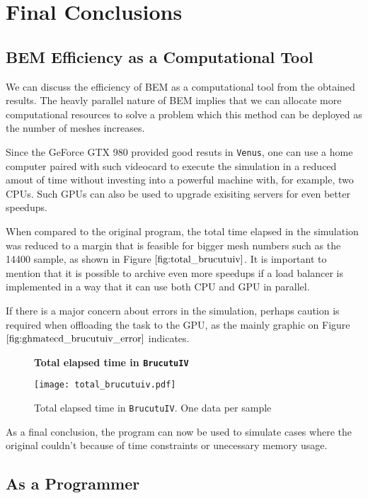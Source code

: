 \chapter{Final Conclusions}
\label{cap:conclusoes}

\section{BEM Efficiency as a Computational Tool}

We can discuss the efficiency of BEM as a computational tool from the obtained results. 
The heavly parallel nature of BEM implies that we can allocate more computational resources 
to solve a problem which this method can be deployed as the number of meshes increases.

Since the GeForce GTX 980 provided good resuts in \texttt{Venus}, one can use a home 
computer paired with such videocard to execute the simulation in a reduced amout of time 
without investing into a powerful machine with, for example, two CPUs. Such GPUs can also 
be used to upgrade exisiting servers for even better speedups.

When compared to the original program, the total time elapsed in the simulation was reduced 
to a margin that is feasible for bigger mesh numbers such as the 14400 sample, as shown in 
Figure $\ref{fig:total_brucutuiv}$. It is important to mention that it is possible to archive even more speedups if a 
load balancer is implemented in a way that it can use both CPU and GPU in parallel.

If there is a major concern about errors in the simulation, perhaps caution is required when 
offloading the task to the GPU, as the mainly graphic on Figure $\ref{fig:ghmatecd_brucutuiv_error}$ 
indicates.

\begin{figure}[ht]
\centering
\textbf{Total elapsed time in \texttt{BrucutuIV}}\par\medskip
\texttt{[image: total\_brucutuiv.pdf]}
\caption{Total elapsed time in \texttt{BrucutuIV}. One data per sample}
\label{fig:total_brucutuiv}
\end{figure}

As a final conclusion, the program can now be used to simulate cases where the original couldn't 
because of time constraints or unecessary memory usage.

\section{As a Programmer}


